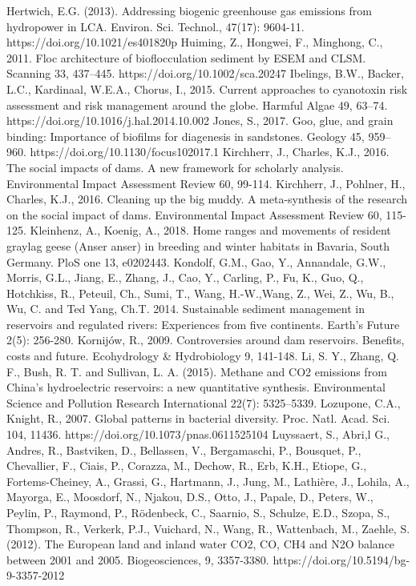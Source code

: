 \begin{thebibliography}{}
Hertwich, E.G. (2013). Addressing biogenic greenhouse gas emissions from hydropower in LCA. Environ. Sci. Technol., 47(17): 9604-11. https://doi.org/10.1021/es401820p
Huiming, Z., Hongwei, F., Minghong, C., 2011. Floc architecture of bioflocculation sediment by ESEM and CLSM. Scanning 33, 437–445. https://doi.org/10.1002/sca.20247
Ibelings, B.W., Backer, L.C., Kardinaal, W.E.A., Chorus, I., 2015. Current approaches to cyanotoxin risk assessment and risk management around the globe. Harmful Algae 49, 63–74. https://doi.org/10.1016/j.hal.2014.10.002
Jones, S., 2017. Goo, glue, and grain binding: Importance of biofilms for diagenesis in sandstones. Geology 45, 959–960. https://doi.org/10.1130/focus102017.1
Kirchherr, J., Charles, K.J., 2016. The social impacts of dams. A new framework for scholarly analysis. Environmental Impact Assessment Review 60, 99-114.
Kirchherr, J., Pohlner, H., Charles, K.J., 2016. Cleaning up the big muddy. A meta-synthesis of the research on the social impact of dams. Environmental Impact Assessment Review 60, 115-125.
Kleinhenz, A., Koenig, A., 2018. Home ranges and movements of resident graylag geese (Anser anser) in breeding and winter habitats in Bavaria, South Germany. PloS one 13, e0202443.
Kondolf, G.M., Gao, Y., Annandale, G.W., Morris, G.L., Jiang, E.,  Zhang, J., Cao, Y., Carling, P., Fu, K., Guo, Q., Hotchkiss, R.,  Peteuil, Ch., Sumi, T., Wang, H.-W.,Wang, Z., Wei, Z., Wu, B.,  Wu, C. and  Ted Yang, Ch.T. 2014. Sustainable sediment management in reservoirs and regulated rivers: Experiences from five continents. Earth’s Future 2(5): 256-280.
Kornijów, R., 2009. Controversies around dam reservoirs. Benefits, costs and future. Ecohydrology & Hydrobiology 9, 141-148.
Li, S. Y., Zhang, Q. F., Bush, R. T. and Sullivan, L. A. (2015). Methane and CO2 emissions from China's hydroelectric reservoirs: a new quantitative synthesis. Environmental Science and Pollution Research International 22(7): 5325–5339.
Lozupone, C.A., Knight, R., 2007. Global patterns in bacterial diversity. Proc. Natl. Acad. Sci. 104, 11436. https://doi.org/10.1073/pnas.0611525104
Luyssaert, S., Abri,l G., Andres, R., Bastviken, D., Bellassen, V., Bergamaschi, P., Bousquet, P., Chevallier, F., Ciais, P., Corazza, M., Dechow, R., Erb, K.H., Etiope, G., Fortems-Cheiney, A., Grassi, G., Hartmann, J., Jung, M., Lathière, J., Lohila, A., Mayorga, E., Moosdorf, N., Njakou, D.S., Otto, J., Papale, D., Peters, W., Peylin, P., Raymond, P., Rödenbeck, C., Saarnio, S., Schulze, E.D., Szopa, S., Thompson, R., Verkerk, P.J., Vuichard, N., Wang, R., Wattenbach, M., Zaehle, S. (2012). The European land and inland water CO2, CO, CH4 and N2O balance between 2001 and 2005. Biogeosciences, 9, 3357-3380. https://doi.org/10.5194/bg-9-3357-2012

\end{thebibliography}
